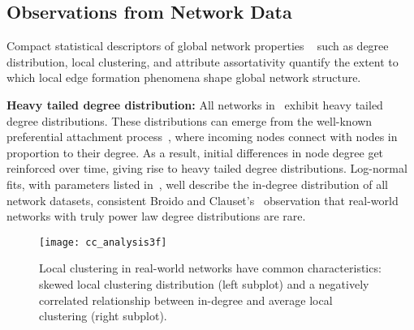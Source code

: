 %


\subsection{Observations from Network Data}
\label{subsec:factors}

Compact
statistical descriptors of global network properties ~\cite{newman2010networks}
such as degree distribution, local clustering, and attribute assortativity
quantify the extent to which local edge formation phenomena shape global network
structure.

\textbf{Heavy tailed degree distribution:} All networks in~ exhibit heavy tailed degree distributions. These
distributions can emerge from the well-known preferential attachment process~\cite{simon1955class,barabasi1999emergence}, where incoming nodes connect with nodes in proportion to their degree. As a result, initial differences in node
degree get reinforced over time, giving rise to heavy
tailed degree distributions.
Log-normal fits, with parameters listed in~, well describe the in-degree
distribution of all network datasets, consistent Broido and Clauset's~\cite{broido2018scale} observation that real-world networks with truly power law
degree distributions are rare.

\begin{figure}[H]
 \vspace{-10pt}
 \centering
 \texttt{[image: cc\_analysis3f]}
 \caption{
    Local clustering in real-world networks have common characteristics:
    skewed local clustering distribution (left subplot) and a negatively correlated
    relationship between in-degree and average local clustering (right subplot).
 }
 \label{fig:cc_dc}
 \vspace{-10pt}
\end{figure}

